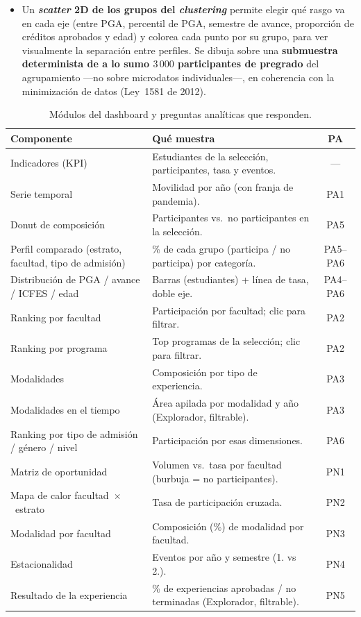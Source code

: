\documentclass[12pt,a4paper]{article}
\begin{document}
\begin{itemize}[leftmargin=*]
    del número de grupos del \emph{clustering} muestra el eje $k=2\ldots10$ completo.
    \item Un \textbf{\emph{scatter} 2D de los grupos del \emph{clustering}} permite
    elegir qué rasgo va en cada eje (entre PGA, percentil de PGA, semestre de avance,
    proporción de créditos aprobados y edad) y colorea cada punto por su grupo, para
    ver visualmente la separación entre perfiles. Se dibuja sobre una
    \textbf{submuestra determinista de a lo sumo $3\,000$ participantes de pregrado}
    del agrupamiento ---no sobre microdatos individuales---, en coherencia con la
    minimización de datos (Ley~1581 de 2012).
\end{itemize}

\begin{table}[H]
\centering
\caption{Módulos del dashboard y preguntas analíticas que responden.}
\label{tab:modulos}
\small
\begin{tabular}{>{\raggedright\arraybackslash}p{5.2cm} >{\raggedright\arraybackslash}p{7.6cm} c}
\toprule
\textbf{Componente} & \textbf{Qué muestra} & \textbf{PA} \\
\midrule
Indicadores (KPI) & Estudiantes de la selección, participantes, tasa y eventos. & — \\
Serie temporal & Movilidad por año (con franja de pandemia). & PA1 \\
Donut de composición & Participantes vs.\ no participantes en la selección. & PA5 \\
Perfil comparado (estrato, facultad, tipo de admisión) & \% de cada grupo (participa / no participa) por categoría. & PA5--PA6 \\
Distribución de PGA / avance / ICFES / edad & Barras (estudiantes) + línea de tasa, doble eje. & PA4--PA6 \\
Ranking por facultad & Participación por facultad; clic para filtrar. & PA2 \\
Ranking por programa & Top programas de la selección; clic para filtrar. & PA2 \\
Modalidades & Composición por tipo de experiencia. & PA3 \\
Modalidades en el tiempo & Área apilada por modalidad y año (Explorador, filtrable). & PA3 \\
Ranking por tipo de admisión / género / nivel & Participación por esas dimensiones. & PA6 \\
Matriz de oportunidad & Volumen vs.\ tasa por facultad (burbuja = no participantes). & PN1 \\
Mapa de calor facultad~$\times$~estrato & Tasa de participación cruzada. & PN2 \\
Modalidad por facultad & Composición (\%) de modalidad por facultad. & PN3 \\
Estacionalidad & Eventos por año y semestre (1.\textordmasculine{} vs 2.\textordmasculine{}). & PN4 \\
Resultado de la experiencia & \% de experiencias aprobadas / no terminadas (Explorador, filtrable). & PN5 \\
\bottomrule
\end{tabular}
\end{table}
\end{document}
